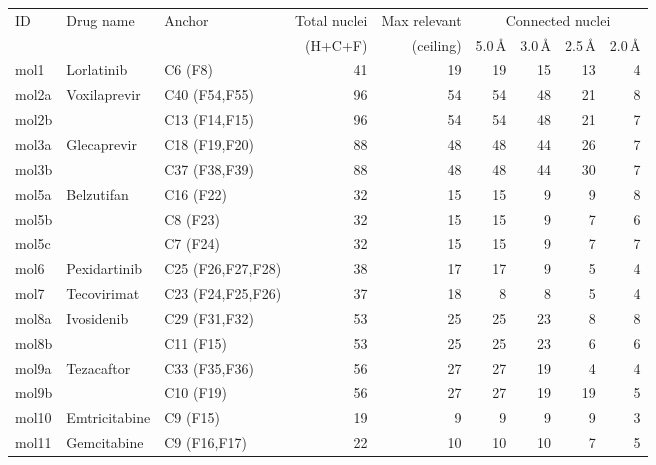 \documentclass[11pt]{article}
\begin{document}
\small
\setlength{\tabcolsep}{3pt}
\begin{longtable}{@{}l l l r r r r r r@{}}
\toprule
ID & Drug name & Anchor & Total nuclei & Max relevant & \multicolumn{4}{c}{Connected nuclei} \\
   &           &        & (H+C+F)      & (ceiling)    & 5.0\,\AA & 3.0\,\AA & 2.5\,\AA & 2.0\,\AA \\
\midrule
\endhead
mol1     & Lorlatinib               & C6 (F8)                &  41 &  19 &  19 &  15 &  13 &   4 \\
mol2a    & Voxilaprevir             & C40 (F54,F55)          &  96 &  54 &  54 &  48 &  21 &   8 \\
mol2b    &                          & C13 (F14,F15)          &  96 &  54 &  54 &  48 &  21 &   7 \\
mol3a    & Glecaprevir              & C18 (F19,F20)          &  88 &  48 &  48 &  44 &  26 &   7 \\
mol3b    &                          & C37 (F38,F39)          &  88 &  48 &  48 &  44 &  30 &   7 \\
mol5a    & Belzutifan               & C16 (F22)              &  32 &  15 &  15 &   9 &   9 &   8 \\
mol5b    &                          & C8 (F23)               &  32 &  15 &  15 &   9 &   7 &   6 \\
mol5c    &                          & C7 (F24)               &  32 &  15 &  15 &   9 &   7 &   7 \\
mol6     & Pexidartinib             & C25 (F26,F27,F28)      &  38 &  17 &  17 &   9 &   5 &   4 \\
mol7     & Tecovirimat              & C23 (F24,F25,F26)      &  37 &  18 &   8 &   8 &   5 &   4 \\
mol8a    & Ivosidenib               & C29 (F31,F32)          &  53 &  25 &  25 &  23 &   8 &   8 \\
mol8b    &                          & C11 (F15)              &  53 &  25 &  25 &  23 &   6 &   6 \\
mol9a    & Tezacaftor               & C33 (F35,F36)          &  56 &  27 &  27 &  19 &   4 &   4 \\
mol9b    &                          & C10 (F19)              &  56 &  27 &  27 &  19 &  19 &   5 \\
mol10    & Emtricitabine            & C9 (F15)               &  19 &   9 &   9 &   9 &   9 &   3 \\
mol11    & Gemcitabine              & C9 (F16,F17)           &  22 &  10 &  10 &  10 &   7 &   5 \\

\end{longtable}
\end{document}

